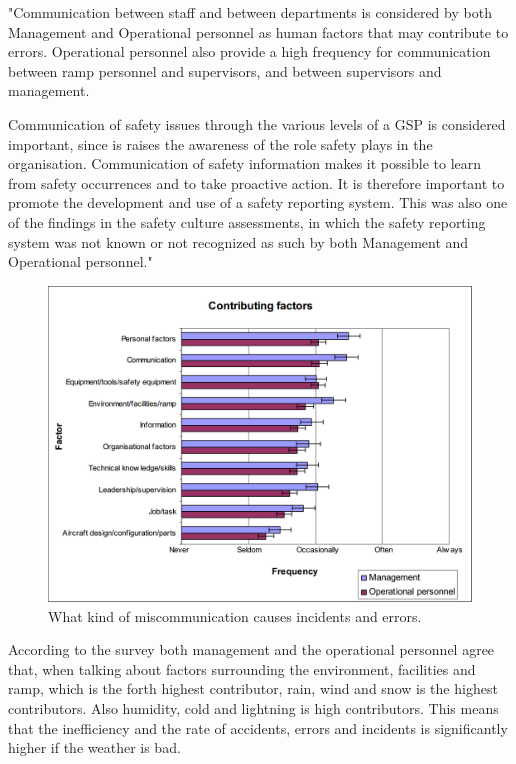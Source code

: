 "Communication between staff and between departments is considered by both Management and Operational personnel as human factors that may contribute to errors. Operational personnel also provide a high frequency for communication between ramp personnel and supervisors, and between supervisors and management. 

Communication of safety issues through the various levels of a GSP is considered important, since is raises the awareness of the role safety plays in the organisation. Communication of safety information makes it possible to learn from safety occurrences and to take proactive action. It is therefore important to promote the development and use of a safety reporting system. This was also one of the findings in the safety culture assessments, in which the safety reporting system was not known or not recognized as such by both Management and Operational personnel."

\begin{figure}[!h]
\centering
\includegraphics[width=\textwidth]{Grafik/ContributingFactors}
\caption{What kind of miscommunication causes incidents and errors.}
\label{ContributingFactors}
\end{figure}

According to the survey both management and the operational personnel agree that, when talking about factors surrounding the environment, facilities and ramp, which is the forth highest contributor, rain, wind and snow is the highest contributors. Also humidity, cold and lightning is high contributors. This means that the inefficiency and the rate of accidents, errors and incidents is significantly higher if the weather is bad.

